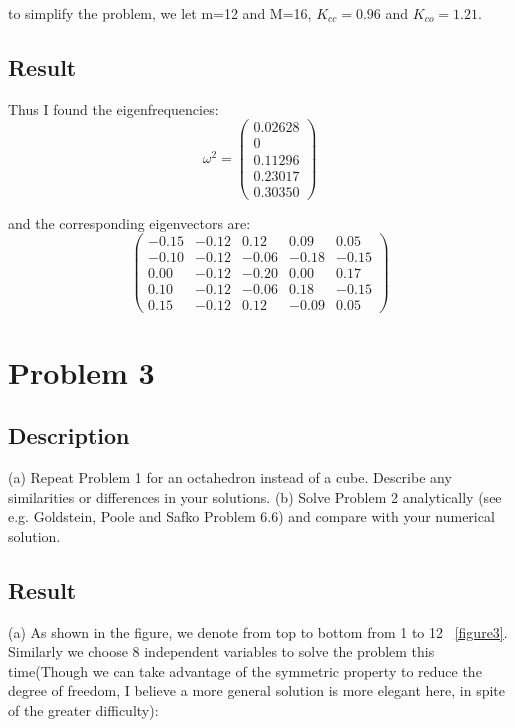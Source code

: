 \documentclass[11pt,letterpaper]{article}
\begin{document}
to simplify the problem, we let m=12 and M=16, $K_{cc}=0.96$ and $K_{co}=1.21$.


\subsection{Result}
Thus I found the eigenfrequencies:
$$
\omega^2=
\begin{pmatrix}
 0.02628\\
 0\\
 0.11296\\
 0.23017\\
 0.30350
\end{pmatrix}
$$

and the corresponding eigenvectors are:
$$
\begin{pmatrix}
 -0.15 & -0.12 & 0.12 & 0.09 & 0.05\\
 -0.10 & -0.12 & -0.06 & -0.18 & -0.15\\
 0.00 & -0.12 & -0.20 & 0.00 & 0.17\\
 0.10 & -0.12 & -0.06 & 0.18 & -0.15\\
 0.15 & -0.12 & 0.12 & -0.09 & 0.05
\end{pmatrix}
$$



\newpage

\section{Problem 3}
\subsection{Description}
(a) Repeat Problem 1 for an octahedron instead of a cube. Describe any similarities or differences in your solutions. 
(b) Solve Problem 2 analytically (see e.g. Goldstein, Poole and Safko Problem 6.6) and compare with your numerical solution.

\subsection{Result}

(a) As shown in the figure, we denote from top to bottom from 1 to 12 ~\ref{figure3}. Similarly we choose 8 independent variables to solve the problem this time(Though we can take advantage of the symmetric property to reduce the degree of freedom, I believe a more general solution is more elegant here, in spite of the greater difficulty):
\end{document}
